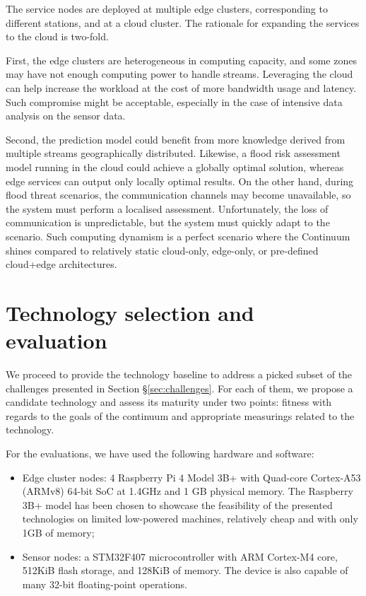 The service nodes are deployed at multiple edge clusters, corresponding to different stations, and at a cloud cluster. The rationale for expanding the services to the cloud is two-fold.

First, the edge clusters are heterogeneous in computing capacity, and some zones may have not enough computing power to handle streams. Leveraging the cloud can help increase the workload at the cost of more bandwidth usage and latency. Such compromise might be acceptable, especially in the case of intensive data analysis on the sensor data.

Second, the prediction model could benefit from more knowledge derived from multiple streams geographically distributed. Likewise, a flood risk assessment model running in the cloud could achieve a globally optimal solution, whereas edge services can output only locally optimal results. On the other hand, during flood threat scenarios, the communication channels may become unavailable, so the system must perform a localised assessment. Unfortunately, the loss of communication is unpredictable, but the system must quickly adapt to the scenario. Such computing dynamism is a perfect scenario where the Continuum shines compared to relatively static cloud-only, edge-only, or pre-defined cloud+edge architectures.

\section{Technology selection and evaluation}\label{sec:technology-selection}

We proceed to provide the technology baseline to address a picked subset of the challenges presented in Section §\ref{sec:challenges}. For each of them, we propose a candidate technology and assess its maturity under two points: fitness with regards to the goals of the continuum and appropriate measurings related to the technology.

For the evaluations, we have used the following hardware and software:

\begin{itemize}
    \item Edge cluster nodes: 4 Raspberry Pi 4 Model 3B+ with Quad-core Cortex-A53 (ARMv8) 64-bit SoC at 1.4GHz and 1 GB physical memory. The Raspberry 3B+ model has been chosen to showcase the feasibility of the presented technologies on limited low-powered machines, relatively cheap and with only 1GB of memory;
    \item Sensor nodes: a STM32F407 microcontroller with ARM Cortex-M4 core, 512KiB flash storage, and 128KiB of memory. The device is also capable of many 32-bit floating-point operations.
\end{itemize}

